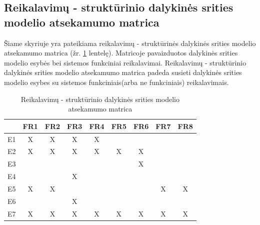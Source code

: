 \documentclass{VUMIFPSkursinis}
\begin{document}
            \subsection{Reikalavimų - struktūrinio dalykinės srities modelio atsekamumo matrica}
            Šiame skyriuje yra pateikiama reikalavimų - struktūrinės dalykinės srities modelio atsekamumo matrica (žr. \ref{Reikalavimų - struktūrinio dalykinės srities modelio atsekamumo matrica} lentelę). Matricoje pavaizduotos dalykinės srities modelio esybės bei sistemos funkciniai reikalavimai. Reikalavimų - struktūrinio dalykinės srities modelio atsekamumo matrica padeda susieti dalykinės srities modelio esybes su sistemos funkciniais(arba ne funkciniais) reikalavimais.
            \begin{table}[H]\footnotesize
                \centering
                \caption{Reikalavimų - struktūrinio dalykinės srities modelio atsekamumo matrica}
                {
                    \begin{tabular}{|c|c|c|c|c|c|c|c|c| }
                    \hline
                          & FR1  & FR2 & FR3 & FR4 & FR5 & FR6 & FR7 & FR8 \\ 
                    \hline
                        E1 & X   & X   & X   & X   &     &     &     &      \\  
                    \hline
                        E2 & X   & X   & X   & X   & X   & X   &     &      \\ 
                    \hline
                        E3 &     &     &     &     &     & X   &     &      \\ 
                    \hline
                        E4 &     &     & X   &     &     &     &     &      \\ 
                    \hline
                        E5 & X   & X   &     &     &     &     & X   & X    \\ 
                    \hline
                        E6 &     &     & X   &     &     &     &     &      \\ 
                    \hline
                        E7 & X   & X   & X   & X   & X   & X   & X   & X    \\ 
                    \hline 
                    \end{tabular}
                }
                \label{Reikalavimų - struktūrinio dalykinės srities modelio atsekamumo matrica}
            \end{table}
      
\end{document}
